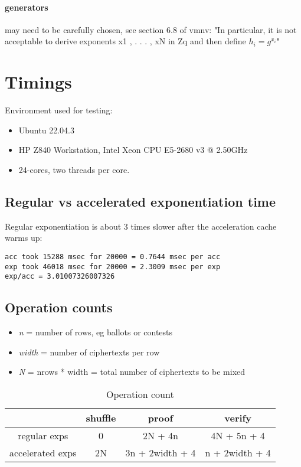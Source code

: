 \documentclass{article}
\begin{document}
\paragraph{generators} may need to be carefully chosen, see section 6.8
of vmnv: "In particular, it is not acceptable to derive exponents
x1 , . . . , xN in Zq and then define $h_i = g^{x_i}$"

\section{Timings}

Environment used for testing:
\begin{itemize}
\item Ubuntu 22.04.3 
\item HP Z840 Workstation, Intel Xeon CPU E5-2680 v3 @ 2.50GHz 
\item 24-cores, two threads per core. 
\end{itemize}

\subsection{Regular vs accelerated exponentiation time}

Regular exponentiation is about 3 times slower after the acceleration
cache warms up:

\begin{verbatim}
acc took 15288 msec for 20000 = 0.7644 msec per acc
exp took 46018 msec for 20000 = 2.3009 msec per exp
exp/acc = 3.01007326007326
\end{verbatim}

\subsection{Operation counts}
\begin{itemize}
\item \emph{n} = number of rows, eg ballots or contests 
\item \emph{width} = number of ciphertexts per row 
\item \emph{N} = nrows {*} width = total number of ciphertexts to be mixed 
\end{itemize}

\begin{table}[H]
    \centering
    \begin{tabular}{c|c|c|c}
        & shuffle  & proof  & verify \\
\hline
regular exps  & 0  & 2N + 4n  & 4N + 5n + 4 \\
accelerated exps  & 2N  & 3n + 2width + 4  & n + 2width + 4 \\
    \end{tabular}
    \caption{Operation count}
    \label{tab:my_label}
\end{table}
\end{document}
